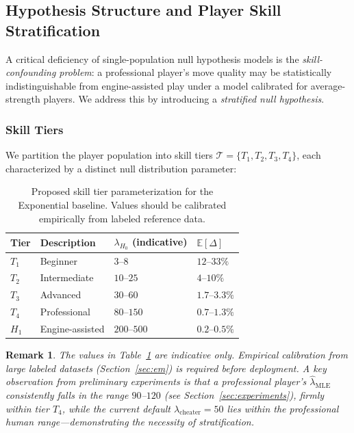 \documentclass[11pt,a4paper]{article}
\newtheorem{remark}{Remark}
\newcommand{\E}{\mathbb{E}}
\begin{document}
\subsection{Hypothesis Structure and Player Skill Stratification}
\label{sec:stratification}

A critical deficiency of single-population null hypothesis models is the
\emph{skill-confounding problem}: a professional player's move quality
may be statistically indistinguishable from engine-assisted play under a
model calibrated for average-strength players. We address this by
introducing a \emph{stratified null hypothesis}.

\subsubsection{Skill Tiers}

We partition the player population into skill tiers $\mathcal{T} =
\{T_1, T_2, T_3, T_4\}$, each characterized by a distinct null
distribution parameter:

\begin{table}[H]
\centering
\caption{Proposed skill tier parameterization for the Exponential baseline.
Values should be calibrated empirically from labeled reference data.}
\label{tab:tiers}
\begin{tabular}{llll}
\toprule
Tier & Description & $\lambda_{H_0}$ (indicative) & $\E[\Delta]$ \\
\midrule
$T_1$ & Beginner       & $3$--$8$   & $12$--$33\%$ \\
$T_2$ & Intermediate   & $10$--$25$ & $4$--$10\%$  \\
$T_3$ & Advanced       & $30$--$60$ & $1.7$--$3.3\%$ \\
$T_4$ & Professional   & $80$--$150$ & $0.7$--$1.3\%$ \\
\hline
$H_1$ & Engine-assisted & $200$--$500$ & $0.2$--$0.5\%$ \\
\bottomrule
\end{tabular}
\end{table}

\begin{remark}
The values in Table~\ref{tab:tiers} are indicative only. Empirical calibration
from large labeled datasets (Section~\ref{sec:em}) is required before
deployment. A key observation from preliminary experiments is that a
professional player's $\hat{\lambda}_{\text{MLE}}$ consistently falls in
the range $90$--$120$ (see Section~\ref{sec:experiments}), firmly within tier
$T_4$, while the current default $\lambda_{\text{cheater}} = 50$ lies
\emph{within} the professional human range---demonstrating the necessity of
stratification.
\end{remark}
\end{document}
